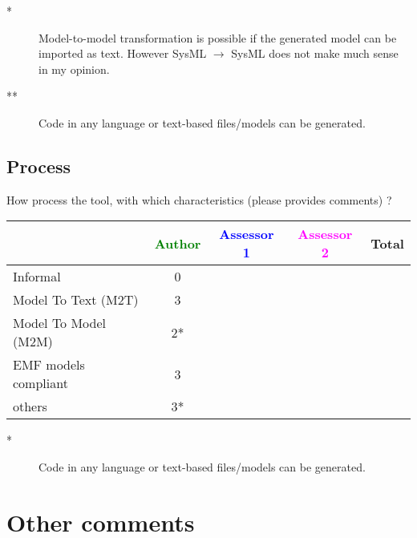 \begin{author_comment}
\begin{description}
\item[*] Model-to-model transformation is possible if the generated model can be imported as text. However SysML $\rightarrow$ SysML does not make much sense in my opinion.
\item[**] Code in any language or text-based files/models can be generated.
\end{description}
\end{author_comment}

\subsection{Process}


How process the tool, with which characteristics (please provides comments) ? 


\begin{tabular}{|l | c | c | c | c|}
\hline
& \textcolor{green}{Author} & \textcolor{blue}{Assessor 1} & \textcolor{magenta}{Assessor 2} & Total \\
\hline 
Informal & 0& & &  \\
\hline
Model To Text (M2T) & 3& & & \\
\hline
Model To Model (M2M) & 2*& & & \\
\hline
EMF models compliant & 3& & & \\
\hline
others & 3*& & & \\
\hline
\end{tabular}

\begin{author_comment}
\begin{description}
\item[*] Code in any language or text-based files/models can be generated.
\end{description}
\end{author_comment}

\section{Other comments}



\begin{comment}
This section is available for the author or the assessors to  complete the description and criteria.
\end{comment}



